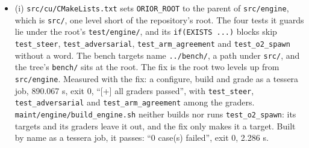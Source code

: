 \begin{enumerate}
\begin{itemize}
\item (i) \texttt{src/\allowbreak{}cu/\allowbreak{}CMake\allowbreak{}Lists.\allowbreak{}txt} sets \texttt{ORIOR\_\allowbreak{}ROOT} to the parent of \texttt{src/\allowbreak{}engine}, which is \texttt{src/\allowbreak{}}, one level short of the repository's root. The four tests it guards lie under the root's \texttt{test/\allowbreak{}engine/\allowbreak{}}, and its \texttt{if(EXISTS .\allowbreak{}.\allowbreak{}.\allowbreak{})} blocks skip \texttt{test\_\allowbreak{}steer}, \texttt{test\_\allowbreak{}adversarial}, \texttt{test\_\allowbreak{}arm\_\allowbreak{}agreement} and \texttt{test\_\allowbreak{}o2\_\allowbreak{}spawn} without a word. The bench targets name \texttt{.\allowbreak{}.\allowbreak{}/\allowbreak{}bench/\allowbreak{}}, a path under \texttt{src/\allowbreak{}}, and the tree's \texttt{bench/\allowbreak{}} sits at the root. The fix is the root two levels up from \texttt{src/\allowbreak{}engine}. Measured with the fix: a configure, build and grade as a tessera job, 890.067 s, exit 0, “[+] all graders passed”, with \texttt{test\_\allowbreak{}steer}, \texttt{test\_\allowbreak{}adversarial} and \texttt{test\_\allowbreak{}arm\_\allowbreak{}agreement} among the graders. \texttt{maint/\allowbreak{}engine/\allowbreak{}build\_\allowbreak{}engine.\allowbreak{}sh} neither builds nor runs \texttt{test\_\allowbreak{}o2\_\allowbreak{}spawn}: its targets and its graders leave it out, and the fix only makes it a target. Built by name as a tessera job, it passes: “0 case(s) failed”, exit 0, 2.286 s.


\end{itemize}
\end{enumerate}
